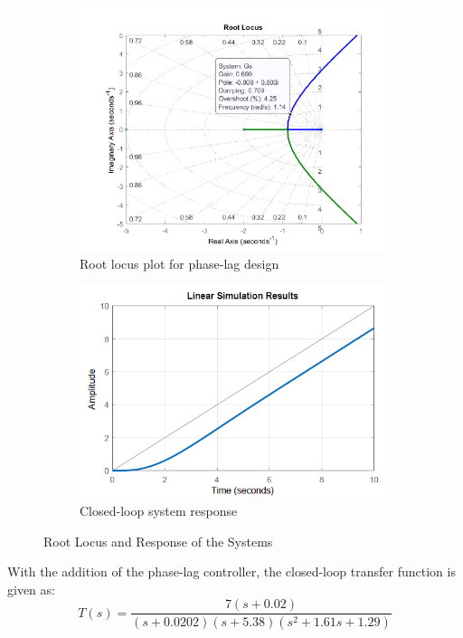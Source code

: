 \documentclass[12pt]{article}
\begin{document}
\begin{figure}[h!]
    \centering
    \begin{subfigure}[b]{0.45\textwidth}
    \centering
    \includegraphics[width=\textwidth]{figs/7.5-1.png}
     \caption{Root locus plot for phase-lag design}
     \end{subfigure}
     \begin{subfigure}[b]{0.45\textwidth}
     \centering
        \includegraphics[width=\textwidth]{figs/7.5-2.png}
     \caption{ Closed-loop system response}
     \end{subfigure}
    \caption{Root Locus and Response of the Systems}\label{fig:prb20}
\end{figure}

\noindent With the addition of the phase-lag controller, the closed-loop transfer function is given as:
$$
T(s)=\frac{7(s+0.02)}{(s+0.0202)(s+5.38)\left(s^2+1.61 s+1.29\right)}
$$
\end{document}
